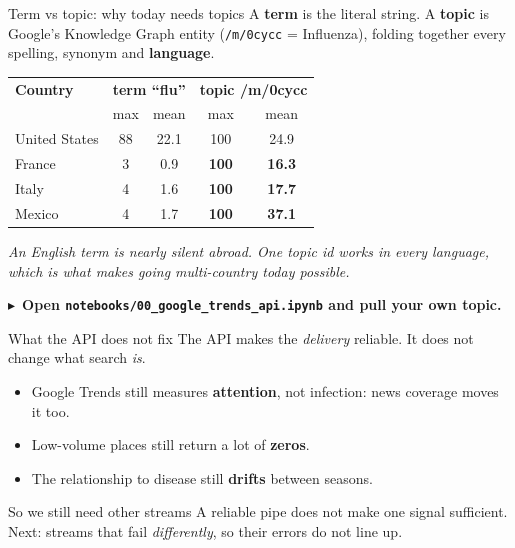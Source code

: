 \documentclass[aspectratio=169,11pt]{beamer}
\newcommand{\tonb}[1]{\vspace{0.1em}\begin{flushright}\footnotesize\textcolor{AccentB}{$\blacktriangleright$~\textbf{#1}}\end{flushright}}
\begin{document}
\begin{frame}{Term vs topic: why today needs topics}
  A \textbf{term} is the literal string. A \textbf{topic} is Google's Knowledge Graph entity
  (\texttt{/m/0cycc} = Influenza), folding together every spelling, synonym and
  \textbf{language}.
  \begin{center}
  \footnotesize
  \begin{tabular}{lcccc}
    \hline
    \textbf{Country} & \multicolumn{2}{c}{\textbf{term ``flu''}} & \multicolumn{2}{c}{\textbf{topic /m/0cycc}} \\
                     & max & mean & max & mean \\
    \hline
    United States & 88 & 22.1 & 100 & 24.9 \\
    France        & 3  & 0.9  & \textbf{100} & \textbf{16.3} \\
    Italy         & 4  & 1.6  & \textbf{100} & \textbf{17.7} \\
    Mexico        & 4  & 1.7  & \textbf{100} & \textbf{37.1} \\
    \hline
  \end{tabular}
  \end{center}
  \vspace{0.2em}
  \begin{center}
    \itshape An English term is nearly silent abroad. One topic id works in every language,
    which is what makes going multi-country today possible.
  \end{center}
  \tonb{Open \texttt{notebooks/00\_google\_trends\_api.ipynb} and pull your own topic.}
\end{frame}

\begin{frame}{What the API does not fix}
  The API makes the \emph{delivery} reliable. It does not change what search \emph{is}.
  \begin{itemize}
    \item Google Trends still measures \textbf{attention}, not infection: news coverage moves
          it too.
    \item Low-volume places still return a lot of \textbf{zeros}.
    \item The relationship to disease still \textbf{drifts} between seasons.
  \end{itemize}
  \vspace{0.3em}
  \begin{alertblock}{So we still need other streams}
    A reliable pipe does not make one signal sufficient. Next: streams that fail
    \emph{differently}, so their errors do not line up.
  \end{alertblock}
\end{frame}
\end{document}
